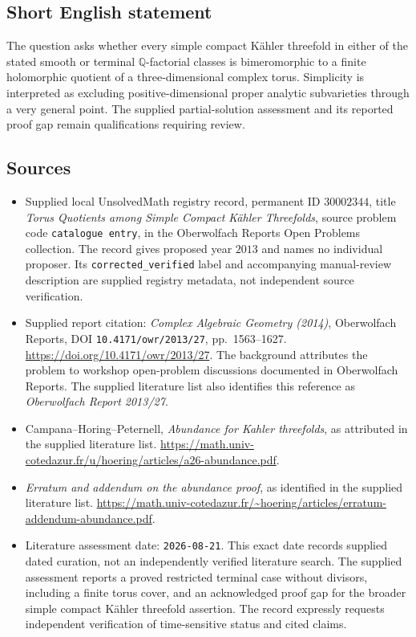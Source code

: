 \documentclass[11pt]{article}
\newcommand{\Q}{\mathbb{Q}}
\begin{document}
\subsection{Short English statement}
The question asks whether every simple compact K\"ahler threefold in either of the stated smooth or terminal \(\Q\)-factorial classes is bimeromorphic to a finite holomorphic quotient of a three-dimensional complex torus. Simplicity is interpreted as excluding positive-dimensional proper analytic subvarieties through a very general point. The supplied partial-solution assessment and its reported proof gap remain qualifications requiring review.
\subsection{Sources}
\begin{itemize}
\item Supplied local UnsolvedMath registry record, permanent ID \(30002344\), title \emph{Torus Quotients among Simple Compact K\"ahler Threefolds}, source problem code \texttt{catalogue entry}, in the Oberwolfach Reports Open Problems collection. The record gives proposed year \(2013\) and names no individual proposer. Its \texttt{corrected\_verified} label and accompanying manual-review description are supplied registry metadata, not independent source verification.
\item Supplied report citation: \emph{Complex Algebraic Geometry (2014)}, Oberwolfach Reports, DOI \texttt{10.4171/owr/2013/27}, pp.\ 1563--1627. \url{https://doi.org/10.4171/owr/2013/27}. The background attributes the problem to workshop open-problem discussions documented in Oberwolfach Reports. The supplied literature list also identifies this reference as \emph{Oberwolfach Report 2013/27}.
\item Campana--Horing--Peternell, \emph{Abundance for Kahler threefolds}, as attributed in the supplied literature list. \url{https://math.univ-cotedazur.fr/u/hoering/articles/a26-abundance.pdf}.
\item \emph{Erratum and addendum on the abundance proof}, as identified in the supplied literature list. \url{https://math.univ-cotedazur.fr/~hoering/articles/erratum-addendum-abundance.pdf}.
\item Literature assessment date: \texttt{2026-08-21}. This exact date records supplied dated curation, not an independently verified literature search. The supplied assessment reports a proved restricted terminal case without divisors, including a finite torus cover, and an acknowledged proof gap for the broader simple compact K\"ahler threefold assertion. The record expressly requests independent verification of time-sensitive status and cited claims.
\end{itemize}
\end{document}
